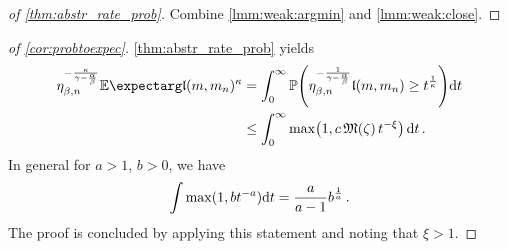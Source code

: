 %
\begin{proof}[of \autoref{thm:abstr_rate_prob}]
	Combine \autoref{lmm:weak:argmin} and \autoref{lmm:weak:close}.
\end{proof}
%
\begin{proof}[of \autoref{cor:probtoexpec}]
\autoref{thm:abstr_rate_prob} yields
\begin{align*}
	\eta_{\beta,n}^{-\frac{\kappa}{\gamma-\frac{\alpha}{\beta}}} \Ex{\mf l (m, m_n)^\kappa} 
	&= 
	\int_0^\infty 
	\PrOf{\eta_{\beta,n}^{-\frac{1}{\gamma-\frac{\alpha}{\beta}}} \mf l (m, m_n) \geq t^{\frac1\kappa}} \dl t
	\\&\leq 
	\int_0^\infty \max\brOf{1, c\, \mf M(\zeta)\, t^{-\xi}} \dl t
	\eqfs
\end{align*}
In general for $a > 1$, $b>0$, we have
\begin{equation*}
	\int \max(1, bt^{-a}) \mathrm{d} t = \frac{a}{a-1} b^{\frac1a}
	\, .
\end{equation*}
The proof is concluded by applying this statement and noting that $\xi > 1$.
\end{proof}
%
%
%
%
%
%
%

